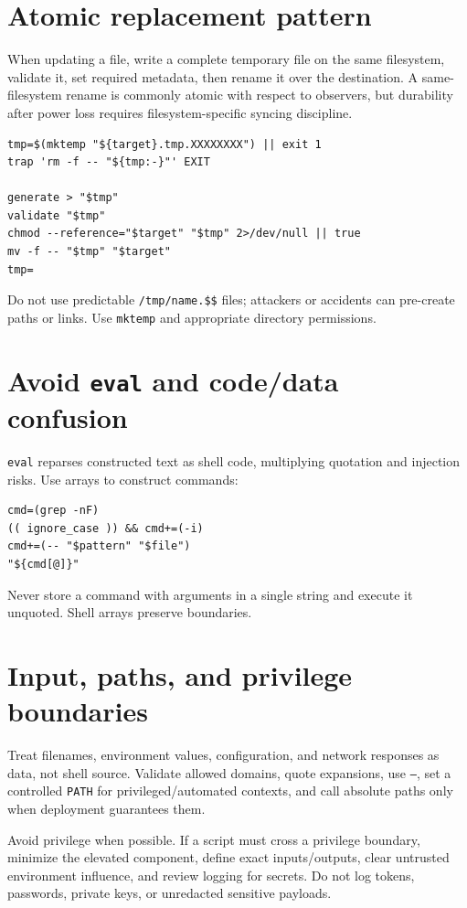 \documentclass[11pt,oneside,openany]{book}
\begin{document}
\section{Atomic replacement pattern}
When updating a file, write a complete temporary file on the same filesystem, validate it, set required metadata, then rename it over the destination. A same-filesystem rename is commonly atomic with respect to observers, but durability after power loss requires filesystem-specific syncing discipline.
\begin{lstlisting}
tmp=$(mktemp "${target}.tmp.XXXXXXXX") || exit 1
trap 'rm -f -- "${tmp:-}"' EXIT

generate > "$tmp"
validate "$tmp"
chmod --reference="$target" "$tmp" 2>/dev/null || true
mv -f -- "$tmp" "$target"
tmp=
\end{lstlisting}
Do not use predictable \texttt{/tmp/name.\$\$} files; attackers or accidents can pre-create paths or links. Use \texttt{mktemp} and appropriate directory permissions.

\section{Avoid \texttt{eval} and code/data confusion}
\texttt{eval} reparses constructed text as shell code, multiplying quotation and injection risks. Use arrays to construct commands:
\begin{lstlisting}
cmd=(grep -nF)
(( ignore_case )) && cmd+=(-i)
cmd+=(-- "$pattern" "$file")
"${cmd[@]}"
\end{lstlisting}
Never store a command with arguments in a single string and execute it unquoted. Shell arrays preserve boundaries.

\section{Input, paths, and privilege boundaries}
Treat filenames, environment values, configuration, and network responses as data, not shell source. Validate allowed domains, quote expansions, use \texttt{--}, set a controlled \texttt{PATH} for privileged/automated contexts, and call absolute paths only when deployment guarantees them.

Avoid privilege when possible. If a script must cross a privilege boundary, minimize the elevated component, define exact inputs/outputs, clear untrusted environment influence, and review logging for secrets. Do not log tokens, passwords, private keys, or unredacted sensitive payloads.
\end{document}
